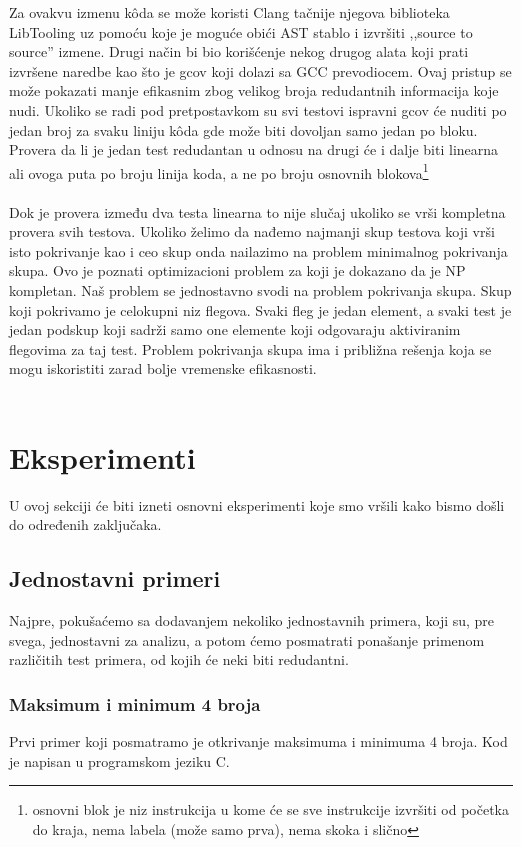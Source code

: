 \documentclass[a4paper]{article}
\begin{document}
Za ovakvu izmenu kôda se može koristi Clang tačnije njegova biblioteka LibTooling uz pomoću koje je moguće obići AST stablo i izvršiti ,,source to source'' izmene. Drugi način bi bio korišćenje nekog drugog alata koji prati izvršene naredbe kao što je gcov koji dolazi sa GCC prevodiocem. Ovaj pristup se može pokazati manje efikasnim zbog velikog broja redudantnih informacija koje nudi. Ukoliko se radi pod pretpostavkom su svi testovi ispravni gcov će nuditi po jedan broj za svaku liniju kôda gde može biti dovoljan samo jedan po bloku. Provera da li je jedan test redudantan u odnosu na drugi će i dalje biti linearna ali ovoga puta po broju linija koda, a ne po broju osnovnih blokova\footnote{osnovni blok je niz instrukcija u kome će se sve instrukcije izvršiti od početka do kraja, nema labela (može samo prva), nema skoka i slično} \\\\
Dok je provera između dva testa linearna to nije slučaj ukoliko se vrši kompletna provera svih testova. Ukoliko želimo da nađemo najmanji skup testova koji vrši isto pokrivanje kao i ceo skup onda nailazimo na problem minimalnog pokrivanja skupa. Ovo je poznati optimizacioni problem za koji je dokazano da je NP kompletan. Naš problem se jednostavno svodi na problem pokrivanja skupa. Skup koji pokrivamo je celokupni niz flegova. Svaki fleg je jedan element, a svaki test je jedan podskup koji sadrži samo one elemente koji odgovaraju aktiviranim flegovima za taj test. Problem pokrivanja skupa ima i približna rešenja koja se mogu iskoristiti zarad bolje vremenske efikasnosti. \\\\


\section{Eksperimenti}
\label{sec:first}
U ovoj sekciji će biti izneti osnovni eksperimenti koje smo vršili kako bismo došli do određenih zaključaka.

\subsection{Jednostavni primeri}
\label{sec:simpleexamples}

Najpre, pokušaćemo sa dodavanjem nekoliko jednostavnih primera, koji su, pre svega, jednostavni za analizu, a potom ćemo posmatrati ponašanje primenom različitih test primera, od kojih će neki biti redudantni.

\subsubsection{Maksimum i minimum 4 broja}
Prvi primer koji posmatramo je otkrivanje maksimuma i minimuma 4 broja. Kod je napisan u programskom jeziku C.
\end{document}
